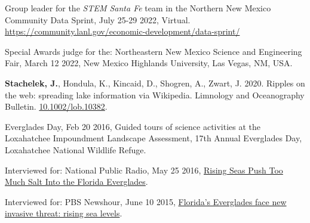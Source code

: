 \documentclass[11pt]{article}
\renewcommand{\section}[1]{\pagebreak[3]%
    \vspace{1.3\baselineskip}%
    \phantomsection\addcontentsline{toc}{section}{#1}%
    \noindent\llap{\scshape\smash{\parbox[t]{\marginparwidth}{\hyphenpenalty=10000\raggedright #1}}}%
    \vspace{-\baselineskip}\par}
\begin{document}
\begin{innerlist}

    \item Group leader for the \emph{STEM Santa Fe} team in the Northern New Mexico Community Data Sprint, July 25-29 2022, Virtual. \href{https://community.lanl.gov/economic-development/data-sprint/}{https://community.lanl.gov/economic-development/data-sprint/}

    \item Special Awards judge for the: Northeastern New Mexico Science and Engineering Fair, March 12 2022, New Mexico Highlands University,  Las Vegas, NM, USA.

    \item \textbf{Stachelek, J.}, Hondula, K., Kincaid, D., Shogren, A., Zwart, J. 2020. Ripples on the web: spreading lake information via Wikipedia. Limnology and Oceanography Bulletin. \href{https://doi.org/10.1002/lob.10382}{10.1002/lob.10382}.

    \item Everglades Day, Feb 20 2016, Guided tours of science activities at the Loxahatchee Impoundment Landscape Assessment, 17th Annual Everglades Day, Loxahatchee National Wildlife Refuge.

    \item Interviewed for: National Public Radio, May 25 2016, \href{https://www.npr.org/2016/05/25/477014085/rising-seas-push-too-much-salt-into-the-florida-everglades}{Rising Seas Push Too Much Salt Into the Florida Everglades}.

    \item Interviewed for: PBS Newshour, June 10 2015, \href{https://www.youtube.com/watch?v=ggOl-vaXIFk}{Florida's Everglades face new invasive threat: rising sea levels}.

\end{innerlist}

% 
\end{document}
